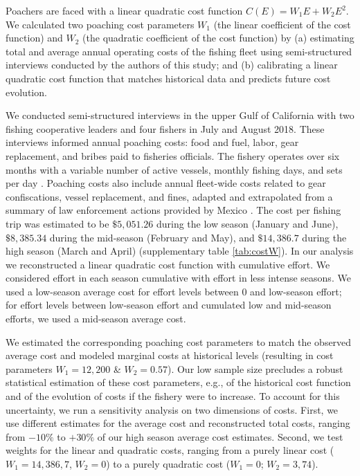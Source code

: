 Poachers are faced with a linear quadratic cost function $C(E) = W_1 E + W_2E^2$. We calculated two poaching cost parameters $W_1$ (the linear coefficient of the cost function) and $W_2$ (the quadratic coefficient of the cost function) by (a) estimating total and average annual operating costs of the fishing fleet using semi-structured interviews conducted by the authors of this study; and (b) calibrating a linear quadratic cost function that matches historical data and predicts future cost evolution. 

We conducted semi-structured interviews in the upper Gulf of California with two fishing cooperative leaders and four fishers in July and August 2018. These interviews informed annual poaching costs: food and fuel, labor, gear replacement, and bribes paid to fisheries officials. The fishery operates over six months with a variable number of active vessels, monthly fishing days, and sets per day \citep{cisneros-mata_evaluacion_2020}. Poaching costs also include annual fleet-wide costs related to gear confiscations, vessel replacement, and fines, adapted and extrapolated from a summary of law enforcement actions provided by Mexico \citep{noauthor_species_2018}. The cost per fishing trip was estimated to be $\$5,051.26$ during the low season (January and June), $\$8,385.34$ during the mid-season (February and May), and $\$14,386.7$ during the high season (March and April) (supplementary table \ref{tab:costW}). In our analysis we reconstructed a linear quadratic cost function with cumulative effort. We considered effort in each season cumulative with effort in less intense seasons. We used a low-season average cost for effort levels between 0 and low-season effort; for effort levels between low-season effort and cumulated low and mid-season efforts, we used a mid-season average cost.

We estimated the corresponding poaching cost parameters to match the observed average cost and modeled marginal costs at historical levels (resulting in cost parameters $W_1 = 12,200$ \& $W_2 = 0.57$). Our low sample size precludes a robust statistical estimation of these cost parameters, e.g., of the historical cost function and of the evolution of costs if the fishery were to increase. To account for this uncertainty, we run a sensitivity analysis on two dimensions of costs. First, we use different estimates for the average cost and reconstructed total costs, ranging from $-10\%$ to $+30\%$ of our high season average cost estimates. Second, we test weights for the linear and quadratic costs, ranging from a purely linear cost ($W_1 = 14,386,7$, $W_2 = 0$) to a purely quadratic cost ($W_1 = 0$; $W_2 = 3,74$).
 
